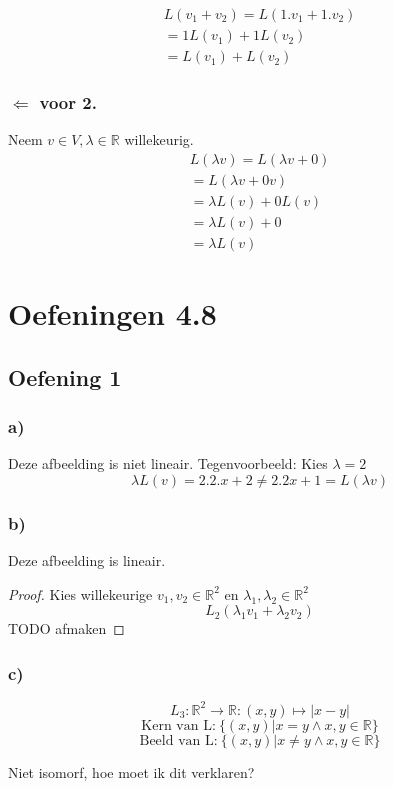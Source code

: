\documentclass[lineaire_algebra_oplossingen.tex]{subfiles}
\begin{document}
\begin{align*}
L(v_1 + v_2) = L(1.v_1+1.v_2) \tag{co\"effici\"ent 1 in V}\\
=1L(v_1)+1L(v_2) \tag{wegens 3.}\\
=L(v_1)+L(v_2) \tag{co\"effici\"ent 1 in W}
\end{align*}

\subsubsection*{$\Leftarrow$ voor 2.}
Neem $v\in V, \lambda \in \mathbb{R}$ willekeurig.
\begin{align*}
L(\lambda v)=L(\lambda v + 0) \tag{neutraal element in V}\\
=L(\lambda v + 0v)\tag{Lemma 3.8}\\
=\lambda L(v) + 0 L(v) \tag{wegens 3.}\\
=\lambda L(v) + 0 \tag{Lemma 3.8 in W}\\
=\lambda L(v) \tag{neutraal element in W}
\end{align*}

\section{Oefeningen 4.8}
\subsection{Oefening 1}
\subsubsection*{a)}
Deze afbeelding is niet lineair. Tegenvoorbeeld: Kies $\lambda = 2$\\
\[
\lambda L(v) = 2 . 2 . x + 2 \neq 2 . 2 x + 1 = L(\lambda v)
\]

\subsubsection*{b)}
Deze afbeelding is lineair.
\begin{proof}
Kies willekeurige $v_1, v_2 \in \mathbb{R}^2$ en $\lambda_1, \lambda_2 \in \mathbb{R}^2$
\[
L_2(\lambda_1v_1 + \lambda_2v_2)
\]
TODO afmaken
\end{proof}

\subsubsection*{c)}
$$
L_3:\mathbb{R}^2\rightarrow\mathbb{R}:(x,y)\mapsto |x-y|
$$
$$
\text{Kern van L:} \ \{(x,y)|x=y \wedge x,y \in \mathbb{R} \}
$$
$$
\text{Beeld van L:} \ \{(x,y)|x\neq y \wedge x,y \in \mathbb{R} \}
$$
\begin{center}
Niet isomorf, hoe moet ik dit verklaren?
\end{center}
\end{document}
